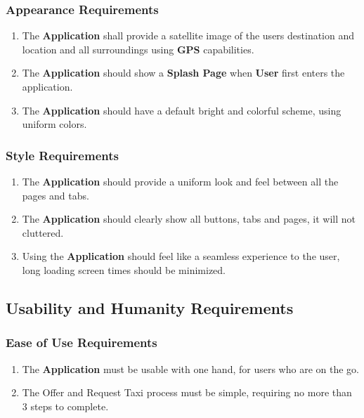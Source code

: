 \documentclass[english]{article}
\begin{document}
\subsubsection{Appearance Requirements}
\label{ssub:appearance_requirements}
\begin{enumerate}[{AR}1. ]
	\item The \textbf{Application} shall provide a satellite image of the users destination and location and all surroundings using \textbf{GPS} capabilities.
	\item The \textbf{Application} should show a \textbf{Splash Page} when \textbf{User} first enters the application.
	\item The \textbf{Application} should have a default bright and colorful scheme, using uniform colors.  
\end{enumerate}

\subsubsection{Style Requirements}
\label{ssub:style_requirements}
\begin{enumerate}[{SR}1. ]
	\item The \textbf{Application} should provide a uniform look and feel between all the pages and tabs.
	\item The \textbf{Application} should clearly show all buttons, tabs and pages, it will not cluttered.
	\item Using the \textbf{Application} should feel like a seamless experience to the user, long loading screen times should be minimized. 
\end{enumerate}


\subsection{Usability and Humanity Requirements}
\label{sub:usability_and_humanity_requirements}

\subsubsection{Ease of Use Requirements}
\label{ssub:ease_of_use_requirements}
\begin{enumerate}[{EUR}1. ]
	\item The \textbf{Application} must be usable with one hand, for users who are on the go.
	\item The Offer and Request Taxi process must be simple, requiring no more than 3 steps to complete.
\end{enumerate}
\end{document}
